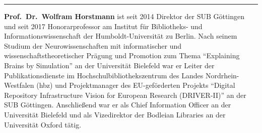\begin{center}\rule{0.5\linewidth}{\linethickness}\end{center}

\textbf{Prof.~Dr.~Wolfram Horstmann} ist seit 2014 Direktor der SUB
Göttingen und seit 2017 Honorarprofessor am Institut für Bibliotheks-
und Informationswissenschaft der Humboldt-Universität zu Berlin. Nach
seinem Studium der Neurowissenschaften mit informatischer und
wissenschaftstheoretischer Prägung und Promotion zum Thema ``Explaining
Brains by Simulation'' an der Universität Bielefeld war er Leiter der
Publikationsdienste im Hochschulbibliothekszentrum des Landes
Nordrhein-Westfalen (hbz) und Projektmanager des EU-geförderten Projekts
\enquote{Digital Repository
Infrastructure Vision for European Research (DRIVER-II)} an der SUB
Göttingen. Anschließend war er als Chief Information Officer an der
Universität Bielefeld und als Vizedirektor der Bodleian Libraries an der
Universität Oxford tätig.

